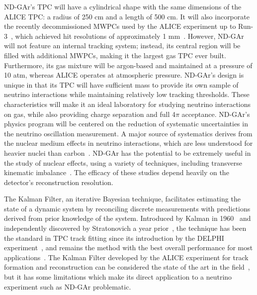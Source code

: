 ND-GAr's TPC will have a cylindrical shape with the same dimensions of the ALICE TPC: a radius of 250 cm and a length of 500 cm. It will also incorporate the recently decommissioned MWPCs used by the ALICE experiment up to Run-3~\cite{Adolfsson_2021}, which achieved hit resolutions of approximately 1 mm~\cite{LIPPMANN2012}. However, ND-GAr will not feature an internal tracking system; instead, its central region will be filled with additional MWPCs, making it the largest gas TPC ever built. Furthermore, its gas mixture will be argon-based and maintained at a pressure of 10 atm, whereas ALICE operates at atmospheric pressure. ND-GAr's design is unique in that its TPC will have sufficient mass to provide its own sample of neutrino interactions while maintaining relatively low tracking thresholds. These characteristics will make it an ideal laboratory for studying neutrino interactions on gas, while also providing charge separation and full 4$\pi$ acceptance. ND-GAr's physics program will be centered on the reduction of systematic uncertainties in the neutrino oscillation measurement. A major source of systematics derives from the nuclear medium effects in neutrino interactions, which are less understood for heavier nuclei than carbon~\cite{Mosel:2016cwa}. ND-GAr has the potential to be extremely useful in the study of nuclear effects, using a variety of techniques, including transverse kinematic imbalance~\cite{Lu:2015hea, PhysRevC.94.015503, PhysRevC.99.055504, Cai:2019jzk, PhysRevD.102.033005}. The efficacy of these studies depend heavily on the detector's reconstruction resolution.

The Kalman Filter, an iterative Bayesian technique, facilitates estimating the state of a dynamic system by reconciling discrete measurements with predictions derived from prior knowledge of the system. Introduced by Kalman in 1960~\cite{Kalman_OG} and independently discovered by Stratonovich a year prior~\cite{stratonovich}, the technique has been the standard in TPC track fitting since its introduction by the DELPHI experiment~\cite{Kalman_app}, and remains the method with the best overall performance for most applications~\cite{RevModPhys.82.1419}. The Kalman Filter developed by the ALICE experiment for track formation and reconstruction can be considered the state of the art in the field~\cite{Ivanov:2003yr, Arslandok:2022dyb}, but it has some limitations which make its direct application to a neutrino experiment such as ND-GAr problematic.




